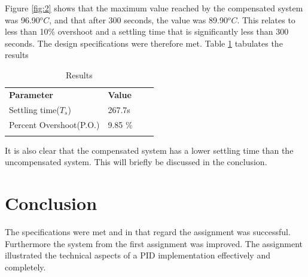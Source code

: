 Figure \ref{fig:2} shows that the maximum value reached by the compensated system was 96.90$^oC$, and that after 300 seconds, the value was 89.90$^oC$. This relates to less than 10\% overshoot and a settling time that is significantly less than 300 seconds. The design specifications were therefore met. Table \ref{tbl:2} tabulates the results 

\begin{table}[h]
\centering
\caption{Results}
\label{tbl:2}
\begin{tabular}{llll}
\cline{1-2}
\multicolumn{1}{|l|}{\textbf{Parameter}}      & \multicolumn{1}{l|}{\textbf{Value}} &  &  \\ \cline{1-2}
\multicolumn{1}{|l|}{Settling time($T_s$)}    & \multicolumn{1}{l|}{267.7s}                   &  &  \\ \cline{1-2}
\multicolumn{1}{|l|}{Percent Overshoot(P.O.)} & \multicolumn{1}{l|}{9.85 \%}                       &  &  \\ \cline{1-2}
                                              &                                             &  & 
\end{tabular}
\end{table}
 It is also clear that the compensated system has a lower settling time than the uncompensated system. This will briefly be discussed in the conclusion.




\chapter{Conclusion}
The specifications were met and in that regard the assignment was successful. Furthermore the system from the first assignment was improved. The assignment illustrated the technical aspects of a PID implementation effectively and completely.


